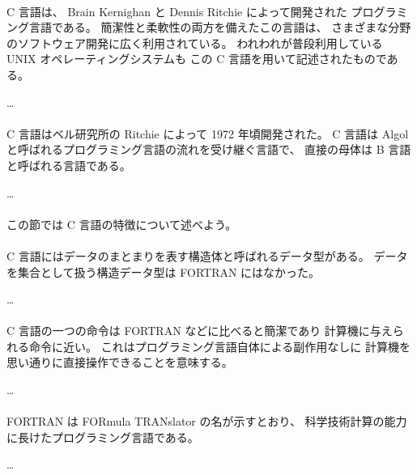 \begin{kekka}
     \\[.2em]

    C 言語は、
    Brain Kernighan と Dennis Ritchie によって開発された
    プログラミング言語である。
    簡潔性と柔軟性の両方を備えたこの言語は、
    さまざまな分野のソフトウェア開発に広く利用されている。
    われわれが普段利用している UNIX オペレーティングシステムも
    この C 言語を用いて記述されたものである。

    \dots \\[.2em]

     \\[.2em]

    C 言語はベル研究所の Ritchie によって 1972 年頃開発された。
    C 言語は Algol と呼ばれるプログラミング言語の流れを受け継ぐ言語で、
    直接の母体は B 言語と呼ばれる言語である。

    \dots \\[.2em]

     \\[.2em]

    この節では C 言語の特徴について述べよう。 \\[.2em]

     \\[.2em]

    C 言語にはデータのまとまりを表す構造体と呼ばれるデータ型がある。
    データを集合として扱う構造データ型は FORTRAN にはなかった。

    \dots \\[.2em]

     \\[.2em]

    C 言語の一つの命令は FORTRAN などに比べると簡潔であり
    計算機に与えられる命令に近い。
    これはプログラミング言語自体による副作用なしに
    計算機を思い通りに直接操作できることを意味する。

    \dots \\[.2em]

     \\[.2em]

    FORTRAN は FORmula TRANslator の名が示すとおり、
    科学技術計算の能力に長けたプログラミング言語である。

    \dots
\end{kekka}

